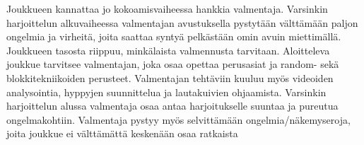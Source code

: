 Joukkueen kannattaa jo kokoamisvaiheessa hankkia valmentaja. Varsinkin harjoittelun alkuvaiheessa valmentajan avustuksella pystytään välttämään paljon ongelmia ja virheitä, joita saattaa syntyä pelkästään omin avuin miettimällä. Joukkueen tasosta riippuu, minkälaista valmennusta tarvitaan. Aloitteleva joukkue tarvitsee valmentajan, joka osaa opettaa perusasiat ja random- sekä blokkitekniikoiden perusteet. Valmentajan tehtäviin kuuluu myös videoiden analysointia, hyppyjen suunnittelua ja lautakuivien ohjaamista. Varsinkin harjoittelun alussa valmentaja osaa antaa harjoitukselle suuntaa ja pureutua ongelmakohtiin. Valmentaja pystyy myös selvittämään ongelmia/näkemyseroja, joita joukkue ei välttämättä keskenään osaa ratkaista 

